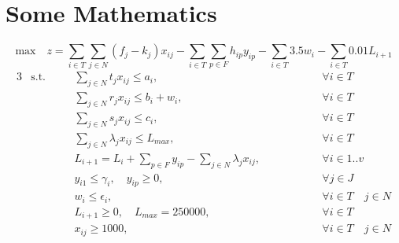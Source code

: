      \section{Some Mathematics}
     \blindmathtrue
     \blindmathpaper
     
    $$
        \text{max} \quad z = \sum_{i \in T}\sum_{j \in N}(f_j-k_j)x_{ij}-\sum_{i \in T}\sum_{p \in F}h_{ip}y_{ip}-\sum_{i \in T}3.5w_i-\sum_{i \in T}0.01L_{i+1} 
    $$
    \begin{alignat*}{3}
        &\text{s.t.} &\quad& \sum_{j \in N}t_jx_{ij} \leq a_i, &\qquad\qquad&  \forall i \in T \label{myLabel}\\
        &\text{} && \sum_{j \in N}r_jx_{ij} \leq b_i+w_i, &&  \forall i \in T
        \label{myLabel}\\
        &\text{} && \sum_{j \in N}s_jx_{ij} \leq c_i, &&  \forall i \in T
        \label{myLabel}\\
        &\text{} && \sum_{j \in N}\lambda_jx_{ij} \leq L_{max}, &&  \forall i \in T
        \label{myLabel}\\
        &\text{} && L_{i+1}=L_i + \sum_{p \in F}y_{ip} - \sum_{j \in N}\lambda_j x_{ij}, &&  \forall i \in 1..v
        \label{myLabel}\\
        &\text{} && y_{i1} \leq \gamma_i,\quad y_{ip} \geq 0, &&  \forall j \in J
        \label{myLabel}\\
        &\text{} && w_i \leq \epsilon_i, &&  \forall i \in T \quad j \in N
        \label{myLabel}\\
        &\text{} && L_{i+1} \geq 0, \quad L_{max} = 250 000, &&  \forall i \in T
        \label{myLabel}\\
        &\text{} && x_{ij} \geq 1000, &&  \forall i \in T \quad j \in N
    \end{alignat*}